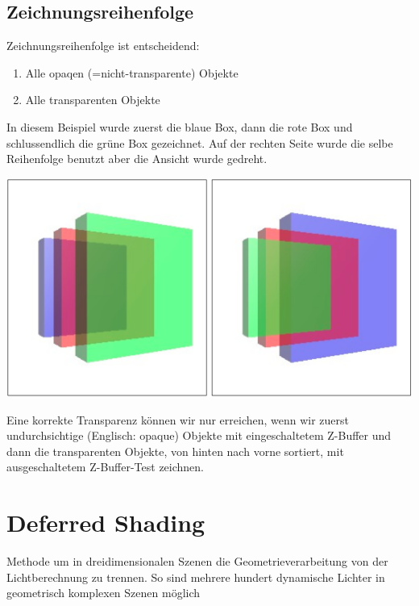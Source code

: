 \documentclass[10pt]{article}
\begin{document}
\subsection{Zeichnungsreihenfolge}
Zeichnungsreihenfolge ist entscheidend:
\begin{enumerate}
	\item Alle opaqen (=nicht-transparente) Objekte
	\item Alle transparenten Objekte
\end{enumerate}
In diesem Beispiel wurde zuerst die blaue Box, dann die rote Box und schlussendlich die grüne Box gezeichnet. Auf der rechten Seite wurde die selbe Reihenfolge benutzt aber die Ansicht wurde gedreht.
\begin{center}
	\includegraphics[scale=0.2]{alphablending_order.png}
\end{center}
Eine korrekte Transparenz können wir nur erreichen, wenn wir zuerst undurchsichtige (Englisch: opaque) Objekte mit eingeschaltetem Z-Buffer und dann die transparenten Objekte, von hinten nach vorne sortiert, mit ausgeschaltetem Z-Buffer-Test zeichnen.


\newpage
\section{Deferred Shading}
Methode um in dreidimensionalen Szenen die Geometrieverarbeitung von der Lichtberechnung zu trennen. So sind mehrere hundert dynamische Lichter in geometrisch komplexen Szenen möglich
\end{document}
